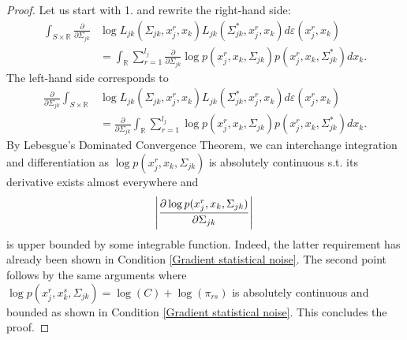 \begin{lemma}
    \begin{proof}
        Let us start with 1. and rewrite the right-hand side:
        \begin{align*}
            \int_{S\times \mathbb{R}} \frac{\partial }{\partial \Sigma_{jk}} & \log L_{jk}(\Sigma_{jk}, x^r_j,x_k) L_{jk}(\Sigma_{jk}^*, x^r_j,x_k) d\varepsilon(x^r_j,x_k)                                                         \\
                                                                             & = \int_\mathbb{R} \sum_{r=1}^{l_{j}} \frac{\partial }{\partial \Sigma_{jk}} \log p(x_j^{r},x_{k}, \Sigma_{jk}) p(x_j^{r},x_{k}, \Sigma^*_{jk}) dx_k.
        \end{align*}
        The left-hand side corresponds to
        \begin{align*}
            \frac{\partial }{\partial \Sigma_{jk}} \int_{S\times \mathbb{R}} & \log L_{jk}(\Sigma_{jk}, x^r_j,x_k) L_{jk}(\Sigma_{jk}^*, x^r_j,x_k) d\varepsilon(x^r_j,x_k)                                                          \\
                                                                             & = \frac{\partial }{\partial \Sigma_{jk}} \int_\mathbb{R} \sum_{r=1}^{l_{j}} \log p(x_j^{r}, x_{k}, \Sigma_{jk}) p(x_j^{r},x_{k}, \Sigma_{jk}^*) dx_k.
        \end{align*}
        By Lebesgue's Dominated Convergence Theorem, we can interchange integration and differentiation as $\log p(x_j^{r}, x_{k}, \Sigma_{jk})$ is absolutely continuous s.t. its derivative exists almost everywhere and
        \begin{equation*}
            \abs{\frac{\partial \log p(x_j^{r}, x_{k}, \Sigma_{jk})}{\partial \Sigma_{jk}}}
        \end{equation*} is upper bounded by some integrable function. Indeed, the latter requirement has already been shown in Condition \ref{Gradient statistical noise}. The second point follows by the same arguments where $\log p(x_j^{r}, x^s_{k}, \Sigma_{jk}) = \log(C) + \log(\pi_{rs})$ is absolutely continuous and bounded as shown in Condition \ref{Gradient statistical noise}. This concludes the proof.
    \end{proof}
\end{lemma}


